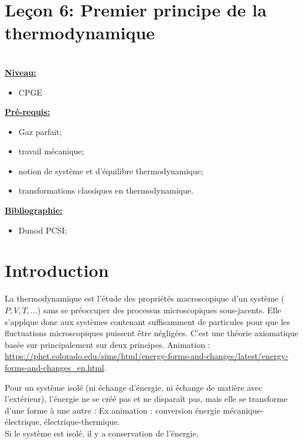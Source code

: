 \documentclass[french, a4paper, 10pt, twocolumn, landscape]{article}
\begin{document}
\section*{Leçon 6: Premier principe de la thermodynamique}

\hrulefill\\

\noindent\underline{\textbf{Niveau:}}
\begin{itemize}
  \item CPGE 
\end{itemize}
\underline{\textbf{Pr{\'e}-requis: }}

\begin{itemize}  
  \item Gaz parfait;
  \item travail mécanique; 
  \item notion de système et d’équilibre thermodynamique;
  \item  transformations classiques en thermodynamique.
\end{itemize}
\underline{\textbf{Bibliographie:}}

\begin{itemize}
  \item Dunod PCSI;
\end{itemize}
\hrulefill

\section*{Introduction}

La thermodynamique est l'étude des propriétés macroscopique d'un système ($P,V,T,...$) sans se préoccuper des processus microscopiques sous-jacents. Elle s'applque donc aux systèmes contenant suffisamment de particules pour que les fluctuations microscopiques puissent être négligées.  C'est une théorie axiomatique basée sur principalement sur deux principes. Animation : \url{https://phet.colorado.edu/sims/html/energy-forms-and-changes/latest/energy-forms-and-changes\_en.html}. 
  
  Pour un système isolé (ni échange d'énergie, ni échange de matière avec l'extérieur), l'énergie ne se créé pas et ne disparaît pas, mais elle se transforme d'une forme à une autre : Ex animation : conversion énergie mécanique-électrique, électrique-thermique. \\
  Si le système est isolé, il y a conservation de l'énergie.
\end{document}
